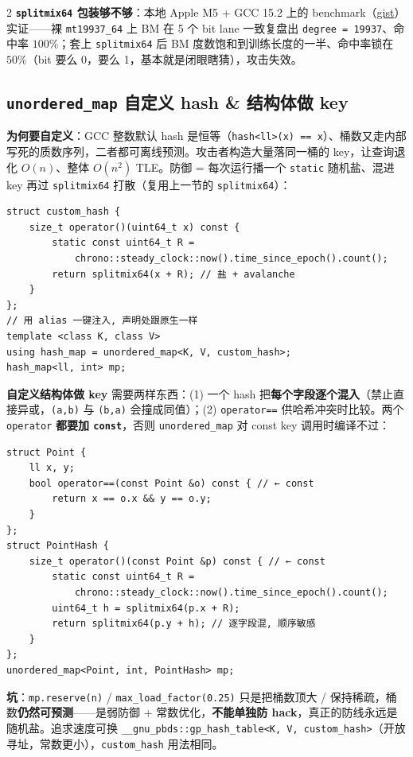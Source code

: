 \begin{multicols*}{2}
		\textbf{\texttt{splitmix64} 包装够不够}：本地 Apple M5 + GCC 15.2 上的 benchmark（\href{https://gist.github.com/znzryb/a867eefeb8575e1c5f599a5044273614}{gist}）实证——裸 \texttt{mt19937\_64} 上 BM 在 5 个 bit lane 一致复盘出 \texttt{degree = 19937}、命中率 $100\%$；套上 \texttt{splitmix64} 后 BM 度数饱和到训练长度的一半、命中率锁在 $50\%$（bit 要么 0，要么 1，基本就是闭眼瞎猜），攻击失效。

		\subsection{\texttt{unordered\_map} 自定义 hash \& 结构体做 key}

		\textbf{为何要自定义}：GCC 整数默认 hash 是恒等（\texttt{hash<ll>(x) == x}）、桶数又走内部写死的质数序列，二者都可离线预测。攻击者构造大量落同一桶的 key，让查询退化 $O(n)$、整体 $O(n^2)$ TLE。防御 = 每次运行播一个 \texttt{static} 随机盐、混进 key 再过 \texttt{splitmix64} 打散（复用上一节的 \texttt{splitmix64}）：

		\begin{verbatim}
struct custom_hash {
	size_t operator()(uint64_t x) const {
		static const uint64_t R =
			chrono::steady_clock::now().time_since_epoch().count();
		return splitmix64(x + R); // 盐 + avalanche
	}
};
// 用 alias 一键注入, 声明处跟原生一样
template <class K, class V>
using hash_map = unordered_map<K, V, custom_hash>;
hash_map<ll, int> mp;
		\end{verbatim}

		\textbf{自定义结构体做 key} 需要两样东西：(1) 一个 hash 把\textbf{每个字段逐个混入}（禁止直接异或，\texttt{(a,b)} 与 \texttt{(b,a)} 会撞成同值）；(2) \texttt{operator==} 供哈希冲突时比较。两个 \texttt{operator} \textbf{都要加 \texttt{const}}，否则 \texttt{unordered\_map} 对 const key 调用时编译不过：

		\begin{verbatim}
struct Point {
	ll x, y;
	bool operator==(const Point &o) const { // ← const
		return x == o.x && y == o.y;
	}
};
struct PointHash {
	size_t operator()(const Point &p) const { // ← const
		static const uint64_t R =
			chrono::steady_clock::now().time_since_epoch().count();
		uint64_t h = splitmix64(p.x + R);
		return splitmix64(p.y + h); // 逐字段混, 顺序敏感
	}
};
unordered_map<Point, int, PointHash> mp;
		\end{verbatim}

		\textbf{坑}：\texttt{mp.reserve(n)} / \texttt{max\_load\_factor(0.25)} 只是把桶数顶大 / 保持稀疏，桶数\textbf{仍然可预测}——是弱防御 + 常数优化，\textbf{不能单独防 hack}，真正的防线永远是随机盐。追求速度可换 \texttt{\_\_gnu\_pbds::gp\_hash\_table<K, V, custom\_hash>}（开放寻址，常数更小），\texttt{custom\_hash} 用法相同。


\end{multicols*}
